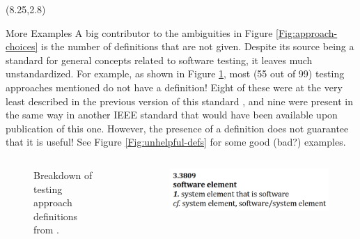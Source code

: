 \documentclass[22pt]{beamer}
\begin{document}
\begin{frame}[fragile]
    \begin{textblock}{7.25}(8.25,2.8)
        \begin{block}{\fontsize{37}{20}\selectfont More Examples}
            A big contributor to the ambiguities in Figure
            \ref{Fig:approach-choices} is the number of definitions that are
            not given. Despite its source \cite{IEEE2022} being a standard for
            general concepts related to software testing, it leaves much
            unstandardized. For example, as shown in Figure \ref{Fig:IEEEdefs},
            most (55 out of 99) testing approaches mentioned do not have a
            definition! Eight of these were at the very least described in the
            previous version of this standard \cite{IEEE2013}, and nine were
            present in the same way in another
            IEEE standard \cite{IEEE2017} that would have been available
            upon publication of this one. However, the presence of a
            definition does not guarantee that it is useful! See Figure
            \ref{Fig:unhelpful-defs} for some good (bad?) examples.
            \vspace{-1cm}
            \begin{columns}
                \begin{column}{0.4\textwidth}
                    \begin{center}
                        \begin{figure}
                            \label{Fig:IEEEdefs}
                            \caption{Breakdown of testing approach definitions
                                from \cite{IEEE2022}.}
                        \end{figure}
                    \end{center}
                \end{column}
                \begin{column}{0.475\textwidth}
                    \begin{center}
                        \begin{figure}
                            \includegraphics[width=\textwidth]{software element.png}


\end{figure}
\end{center}
\end{column}
\end{columns}
\end{block}
\end{textblock}
\end{frame}
\end{document}
